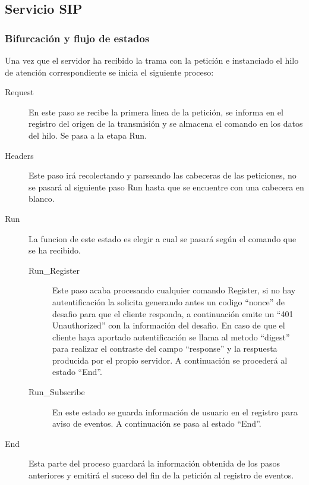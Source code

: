 \documentclass[a4paper,spanish,12pt]{book}
\begin{document}
\subsection{Servicio SIP}
\subsubsection{Bifurcación y flujo de estados} 
Una vez que el servidor ha recibido la trama con la petición e instanciado el hilo de atención correspondiente se inicia el siguiente proceso:
\begin{description}
	\item[Request] En este paso se recibe la primera linea de la petición, se informa en el registro del origen de la transmisión y se almacena el comando en los datos del hilo. Se pasa a la etapa Run.
	\item[Headers] Este paso irá recolectando y parseando las cabeceras de las peticiones, no se pasará al siguiente paso Run hasta que se encuentre con una cabecera en blanco.
	\item[Run] La funcion de este estado es elegir a cual se pasará según el comando que se ha recibido.
	\begin{description}
		\item[Run\_Register] Este paso acaba procesando cualquier comando Register, si no hay autentificación la solicita generando antes un codigo ``nonce'' de desafio para que el cliente responda, a continuación emite un ``401 Unauthorized'' con la información del desafio. En caso de que el cliente haya aportado autentificación se llama al metodo ``digest'' para realizar el contraste del campo ``response'' y la respuesta producida por el propio servidor. A continuación se procederá al estado ``End''.
		\item[Run\_Subscribe] En este estado se guarda información de usuario en el registro para aviso de eventos. A continuación se pasa al estado ``End''.
	\end{description}
	\item[End] Esta parte del proceso guardará la información obtenida de los pasos anteriores y emitirá el suceso del fin de la petición al registro de eventos.
\end{description}
\end{document}
